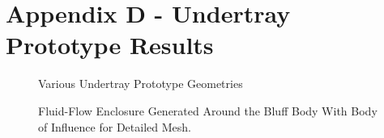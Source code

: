\newpage
\flushleft
\section*{Appendix D - Undertray Prototype Results} 


\begin{figure}[!htb]
    \centering
    \noindent{}
    \caption{Various Undertray Prototype Geometries}
    \label{fig:UTP_D}
\end{figure}

\begin{figure}[!htb]
    \centering
    \noindent{}
    \caption{Fluid-Flow Enclosure Generated Around the Bluff Body With Body of Influence for Detailed Mesh.}
    \label{fig:UTP_Fluid_flow}
\end{figure}



